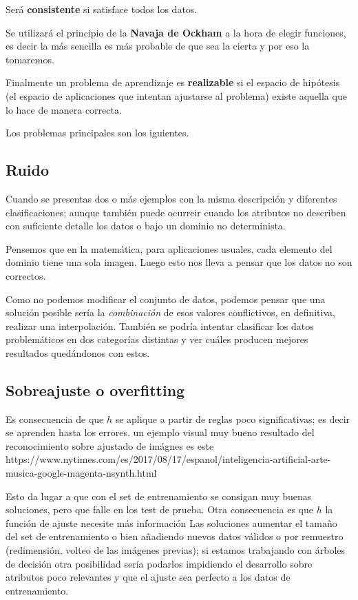 \documentclass[12 pt, a4paper]{article}
\begin{document}
Será \textbf{consistente} si satisface todos los datos. 

Se utilizará el principio de la \textbf{Navaja de Ockham} a la hora de elegir funciones, es decir
la más sencilla es más probable de que sea la cierta y por eso la tomaremos. 

Finalmente un problema de aprendizaje es \textbf{realizable} si el espacio de hipótesis (el espacio de aplicaciones que intentan ajustarse al problema) existe aquella que lo hace de manera correcta. 


Los problemas principales son los iguientes. 

\subsection*{Ruido}  

Cuando se presentas dos o más ejemplos con la misma descripción y diferentes clasificaciones; aunque también puede ocurreir cuando 
los atributos no describen con suficiente detalle los datos o bajo un dominio no determinista. 

Pensemos que en la matemática, para aplicaciones usuales, cada elemento del dominio tiene una sola imagen.
Luego esto nos lleva a pensar que los datos no son correctos. 

Como no podemos modificar el conjunto de datos, podemos pensar que una solución posible sería la \textit{combinación} de esos valores conflictivos, 
en definitiva, realizar una interpolación.  También se podría intentar clasificar los datos problemáticos en dos categorías distintas y ver cuáles producen mejores 
resultados quedándonos con estos. 

\subsection*{Sobreajuste o overfitting}  

Es consecuencia de que $h$ se aplique a partir de reglas poco significativas; es decir se aprenden hasta los errores. 
un ejemplo visual muy bueno resultado del reconocimiento sobre ajustado de imágnes 
es este https://www.nytimes.com/es/2017/08/17/espanol/inteligencia-artificial-arte-musica-google-magenta-nsynth.html

Esto da lugar a que con el set de entrenamiento se consigan muy buenas soluciones, pero que falle en los test de prueba. 
Otra consecuencia es que $h$ la función de ajuste necesite más información 
Las soluciones aumentar el tamaño del set de entrenamiento o bien añadiendo nuevos datos válidos o por remuestro (redimensión, volteo de las imágenes previas); 
si estamos trabajando con árboles de decisión otra posibilidad sería podarlos impidiendo el desarrollo sobre atributos poco relevantes y que el ajuste sea perfecto a los datos de entrenamiento. 
\end{document}
